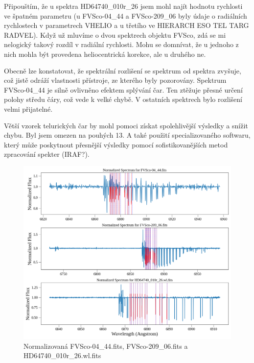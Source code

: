\documentclass[a4paper,11pt,twocolumn]{article}
\begin{document}
        Připouštím, že u spektra HD64740\_010r\_26 jsem mohl najít hodnotu rychlosti ve špatném parametru (u FVSco-04\_44 a FVSco-209\_06 byly údaje o radiálních rychlostech v parametrech VHELIO a u třetího ve HIERARCH ESO TEL TARG RADVEL). 
        Když už mluvíme o dvou spektrech objektu FVSco, zdá se mi nelogický takový rozdíl v radiální rychlosti. Mohu se domnívat, že u jednoho z nich mohla být provedena heliocentrická korekce, ale u druhého ne. 

        Obecně lze konstatovat, že spektrální rozlišení se spektrum od spektra zvyšuje, což jistě odráží vlastnosti přístroje, ze kterého byly pozorovány. Spektrum FVSco-04\_44 je silně ovlivněno efektem splývání čar. Ten ztěžuje přesné určení polohy středu čáry, což vede k velké chybě. V ostatních spektrech bylo rozlišení velmi přijatelné. 

        Větší vzorek telurických čar by mohl pomoci získat spolehlivější výsledky a snížit chybu. Byl jsem omezen na pouhých 13. A také použití specializovaného softwaru, který může poskytnout přesnější výsledky pomocí sofistikovanějších metod zpracování spekter (IRAF?). 

    \newpage
    
    \nocite{*}
    

    \begin{figure}
        \centering
        \includegraphics[width=1\textwidth]{spectra.png}
        \caption{Normalizovaná FVSco-04\_44.fits, FVSco-209\_06.fits a HD64740\_010r\_26.wl.fits}
        \label{fig:spectra}
    \end{figure}
\end{document}
